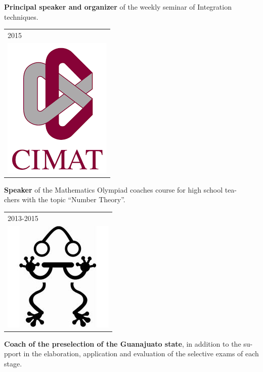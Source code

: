 \documentclass[]{friggeri-cv}
\begin{document}
\begin{entrylist}
{\begin{tabular}{l}
	\end{tabular}
    }
    {\vspace{-1.49cm}}
    { }
    {\textbf{Principal speaker and organizer} of the weekly seminar of Integration techniques.}
\entry
     {   \begin{tabular}{l}
    		\hspace{0.9cm}2015\\
     		\hspace{0.5cm}\includegraphics[scale=0.2]{img/cimat.png}
	\end{tabular}
    }
    {\vspace{-1.4cm}}
    { }
    {\textbf{Speaker} of the Mathematics Olympiad coaches course for high school tea-\\chers with the topic “Number Theory”.}
    \entry
     {   \begin{tabular}{l}
    		\hspace{0.3cm}2013-2015\\
     		\hspace{0.5cm}\includegraphics[scale=0.23]{img/ommgto.jpg}
	\end{tabular}
    }
    {\vspace{-1.27cm}}
    { }
    {\textbf{Coach of the preselection of the Guanajuato state}, in addition to the su-\\pport in the elaboration, application and evaluation of the selective exams of each stage.}
\end{entrylist}
\vspace{-0.5cm}
\end{document}
